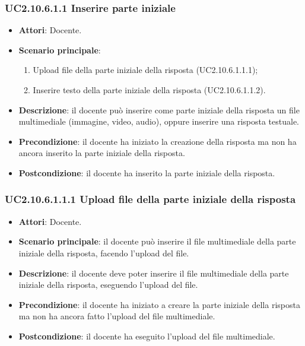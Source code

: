 \subsubsection{UC2.10.6.1.1 Inserire parte iniziale}
\begin{itemize}
\item \textbf{Attori}: Docente.
\item \textbf{Scenario principale}:
\begin{enumerate}
\item Upload file della parte iniziale della risposta (UC2.10.6.1.1.1);
\item Inserire testo della parte iniziale della risposta (UC2.10.6.1.1.2).
\end{enumerate}
\item \textbf{Descrizione}: il docente può inserire come parte iniziale della risposta un file multimediale (immagine, video, audio), oppure inserire una risposta testuale.
\item \textbf{Precondizione}: il docente ha iniziato la creazione della risposta ma non ha ancora inserito la parte iniziale della risposta.
\item \textbf{Postcondizione}: il docente ha inserito la parte iniziale della risposta.
\end{itemize}
\subsubsection{UC2.10.6.1.1.1 Upload file della parte iniziale della risposta}
\begin{itemize}
\item \textbf{Attori}: Docente.
\item \textbf{Scenario principale}: il docente può inserire il file multimediale della parte iniziale della risposta, facendo l'upload del file.
\item \textbf{Descrizione}: il docente deve poter inserire il file multimediale della parte iniziale della risposta, eseguendo l'upload del file.
\item \textbf{Precondizione}: il docente ha iniziato a creare la parte iniziale della risposta ma non ha ancora fatto l'upload del file multimediale.
\item \textbf{Postcondizione}: il docente ha eseguito l'upload del file multimediale.
\end{itemize}
